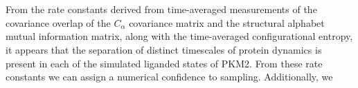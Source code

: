\documentclass[11pt]{article}
\begin{document}
\\
\\
From the rate constants derived from time-averaged measurements of the covariance overlap of the $C_\alpha$ covariance matrix and the structural alphabet mutual information matrix, along with the time-averaged configurational entropy, it appears that the separation of distinct timescales of protein dynamics is present in each of the simulated liganded states of PKM2. From these rate constants we can assign a numerical confidence to sampling. Additionally, we  
\end{document}

